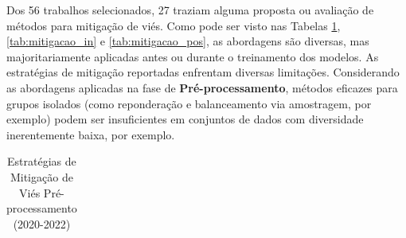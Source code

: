 Dos 56 trabalhos selecionados, 27 traziam alguma proposta ou avaliação de métodos para mitigação de viés. Como pode ser visto nas Tabelas \ref{tab:mitigacao_pre}, \ref{tab:mitigacao_in} e \ref{tab:mitigacao_pos}, as abordagens são diversas, mas majoritariamente aplicadas antes ou durante o treinamento dos modelos. As estratégias de mitigação reportadas enfrentam diversas limitações. Considerando as abordagens aplicadas na fase de \textbf{Pré-processamento}, métodos eficazes para grupos isolados (como reponderação e balanceamento via amostragem, por exemplo) podem ser insuficientes em conjuntos de dados com diversidade inerentemente baixa, por exemplo.

\newpage
\begin{longtable}{p{3cm}|p{11cm}}%
\caption{Estratégias de Mitigação de Viés Pré-processamento (2020-2022)} \label{tab:mitigacao_pre} \\


\end{longtable}
